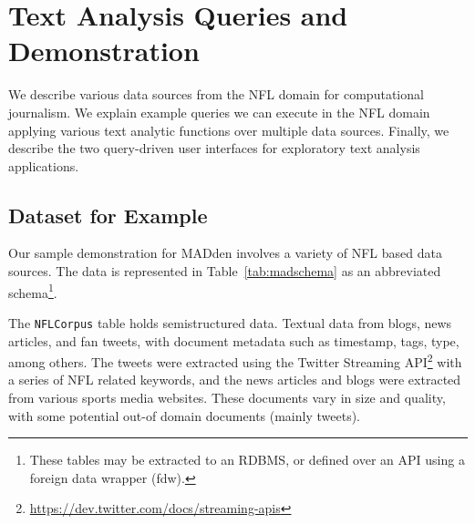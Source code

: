 \section{Text Analysis Queries and Demonstration}

We describe various data sources from the NFL domain for computational
journalism. 
We explain example queries we can execute in the NFL domain applying
various text analytic functions over multiple data sources. 
Finally, we describe the two query-driven user interfaces for 
exploratory text analysis applications.


\subsection{Dataset for Example}
Our sample demonstration for MADden involves a variety of NFL based data sources. 
The data is represented in Table~\ref{tab:madschema} as an abbreviated
schema\footnote{These tables may be extracted to an RDBMS, or defined over an
API using a foreign data wrapper (fdw).}.

The {\tt NFLCorpus} table holds semistructured data. Textual data from blogs,
news articles, and fan tweets, with document metadata such as timestamp, tags,
type, among others. The tweets were extracted using the Twitter Streaming API\footnote{\url{https://dev.twitter.com/docs/streaming-apis}}
with a series of NFL related keywords, and the news articles and blogs were
extracted from various sports media websites. These documents vary in size and
quality, with some potential out-of domain documents (mainly tweets).

